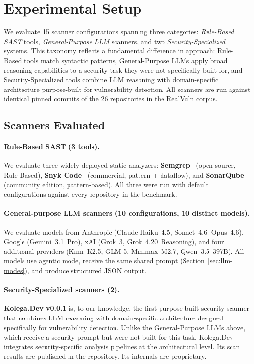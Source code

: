 \section{Experimental Setup}
\label{sec:experimental-setup}

We evaluate 15 scanner configurations spanning three categories:
\emph{Rule-Based SAST} tools, \emph{General-Purpose LLM} scanners, and
two \emph{Security-Specialized} systems. This taxonomy reflects a
fundamental difference in approach: Rule-Based tools match syntactic
patterns, General-Purpose LLMs apply broad reasoning capabilities to a
security task they were not specifically built for, and
Security-Specialized tools combine LLM reasoning with domain-specific
architecture purpose-built for vulnerability detection.
All scanners are run against identical pinned commits of the 26
repositories in the RealVuln corpus.

\subsection{Scanners Evaluated}
\label{sec:scanners}

\paragraph{Rule-Based SAST (3 tools).}
We evaluate three widely deployed static analyzers: \textbf{Semgrep}~\cite{semgrep} (open-source, Rule-Based), \textbf{Snyk Code}~\cite{snyk} (commercial, pattern + dataflow), and \textbf{SonarQube}~\cite{sonarqube} (community edition, pattern-based). All three were run with default configurations against every repository in the benchmark.

\paragraph{General-purpose LLM scanners (10 configurations, 10 distinct models).}
We evaluate models from Anthropic (Claude Haiku~4.5, Sonnet~4.6, Opus~4.6), Google (Gemini~3.1~Pro), xAI (Grok~3, Grok~4.20~Reasoning), and four additional providers (Kimi~K2.5, GLM-5, Minimax~M2.7, Qwen~3.5~397B). All models use agentic mode, receive the same shared prompt (Section~\ref{sec:llm-modes}), and produce structured JSON output.

\paragraph{Security-Specialized scanners (2).}
\textbf{Kolega.Dev v0.0.1} is, to our knowledge, the first purpose-built
security scanner that combines LLM reasoning with domain-specific
architecture designed specifically for vulnerability detection. Unlike
the General-Purpose LLMs above, which receive a security prompt but
were not built for this task, Kolega.Dev integrates security-specific
analysis pipelines at the architectural level. Its scan results are
published in the repository. Its internals are proprietary.


